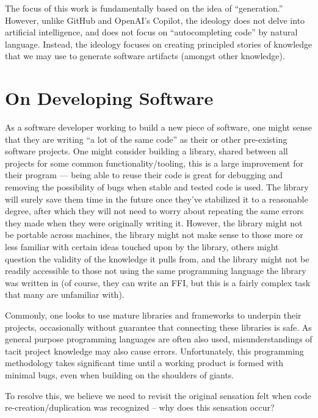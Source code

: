 The focus of this work is fundamentally based on the idea of ``generation.''
However, unlike GitHub and OpenAI's Copilot, the ideology does not delve into
artificial intelligence, and does not focus on ``autocompleting code'' by
natural language. Instead, the ideology focuses on creating principled stories
of knowledge that we may use to generate software artifacts (amongst other
knowledge).

\section{On Developing Software}
\label{sec:idlgy:on_developing_software}

As a software developer working to build a new piece of software, one might
sense that they are writing ``a lot of the same code'' as their or other
pre-existing software projects. One might consider building a library, shared
between all projects for some common functionality/tooling, this is a large
improvement for their program --- being able to reuse their code is great for
debugging and removing the possibility of bugs when stable and tested code is
used. The library will surely save them time in the future once they've
stabilized it to a reasonable degree, after which they will not need to worry
about repeating the same errors they made when they were originally writing it.
However, the library might not be portable across machines, the library might
not make sense to those more or less familiar with certain ideas touched upon by
the library, others might question the validity of the knowledge it pulls from,
and the library might not be readily accessible to those not using the same
programming language the library was written in (of course, they can write an
FFI, but this is a fairly complex task that many are
unfamiliar with).

Commonly, one looks to use mature libraries and frameworks to underpin their
projects, occasionally without guarantee that connecting these libraries is
safe. As general purpose programming languages are often also used,
misunderstandings of tacit project knowledge may also cause errors.
Unfortunately, this programming methodology takes significant time until a
working product is formed with minimal bugs, even when building on the shoulders
of giants.

To resolve this, we believe we need to revisit the original sensation felt when
code re-creation/duplication was recognized -- why does this sensation occur?

